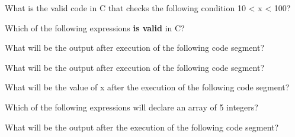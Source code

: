 \documentclass[11pt]{examdesign}
\begin{document}


\begin{multiplechoice}[title={},suppressprefix=yes,rearrange=no]
\begin{question}
What is the valid code in C that checks the following condition 10 < x <
100?
\end{question}

\begin{question}
Which of the following expressions \textbf{is valid} in C?
\end{question}

\begin{question}
What will be the output after execution of the following code segment?
\end{question}

\begin{question}
What will be the output after execution of the following code segment?
\end{question}

\begin{question}
What will be the value of x after the execution of the following code segment?
\end{question}
  
\begin{question}
Which of the following expressions will declare an array of 5 integers?
\end{question}
  
\begin{question}
What will be the output after the execution of the following code segment?
\end{question}
  

\end{multiplechoice}
\end{document}
